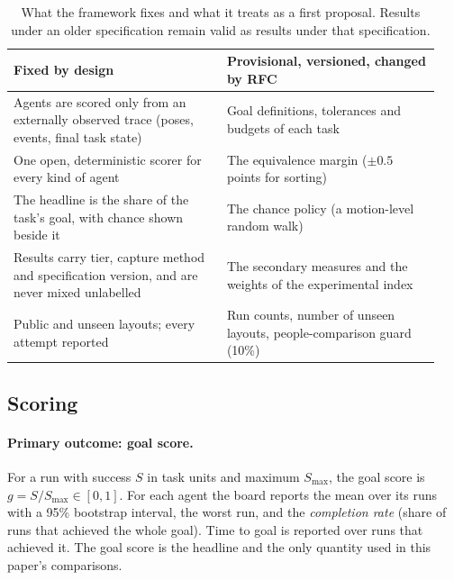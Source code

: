 \documentclass[11pt]{article}
\begin{document}
\begin{table}[t]
\centering\small
\begin{tabular}{@{}p{0.47\linewidth}p{0.47\linewidth}@{}}
\toprule
\textbf{Fixed by design} & \textbf{Provisional, versioned, changed by RFC} \\
\midrule
Agents are scored only from an externally observed trace (poses, events, final task state) &
Goal definitions, tolerances and budgets of each task \\[2pt]
One open, deterministic scorer for every kind of agent & The equivalence margin ($\pm0.5$ points for sorting) \\[2pt]
The headline is the share of the task's goal, with chance shown beside it & The chance policy (a motion-level random walk) \\[2pt]
Results carry tier, capture method and specification version, and are never mixed unlabelled &
The secondary measures and the weights of the experimental index \\[2pt]
Public and unseen layouts; every attempt reported & Run counts, number of unseen layouts, people-comparison guard (10\%) \\
\bottomrule
\end{tabular}
\caption{What the framework fixes and what it treats as a first proposal. Results under an older
specification remain valid as results under that specification.}
\label{tab:fixed}
\end{table}

\subsection{Scoring}

\paragraph{Primary outcome: goal score.} For a run with success $S$ in task units and maximum
$S_{\max}$, the goal score is $g = S/S_{\max}\in[0,1]$. For each agent the board reports the mean over
its runs with a 95\% bootstrap interval, the worst run, and the \emph{completion rate} (share of runs
that achieved the whole goal). Time to goal is reported over runs that achieved it. The goal score is
the headline and the only quantity used in this paper's comparisons.
\end{document}

